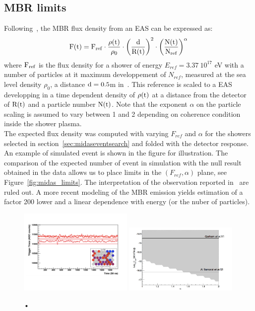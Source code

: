 \documentclass{PoS}
\begin{document}
\subsection{MBR limits}
Following~\cite{gorham}, the MBR flux density from an EAS can be expressed as: 
\begin{equation}
\rm F(t) = F_{ref} \cdot \frac{\rho (t)}{\rho_0}\cdot \left(  \frac{d}{R(t)}\right)^2 \cdot \left( \frac{N(t)}{N_{ref}}\right) ^\alpha
\label{eq:fluxdensity}
\end{equation}
where $\rm F_{ref}$ is the flux density for a shower of energy $E_{ref} = 3.37 \ 10^{17} $ eV with a number of particles at it maximum developpement of $N_{ref}$, measured at the sea level density $\rho_{0}$, a distance $\rm d = 0.5 $m in~\cite{gorham}. This reference is scaled to a EAS developping in a time dependent density of $\rm \rho(t)$ at a distance from the detector of $\rm R(t)$ and a particle number $\rm N(t)$. Note that the exponent $\alpha$ on the particle scaling is assumed to vary between 1 and 2 depending on coherence condition inside the shower plasma. \\The expected flux density was computed with varying $F_{ref}$ and $\alpha$ for the showers selected in section~\ref{sec:midaseventsearch} and folded with the detector response. An example of simulated event is shown in the figure for illustration. The comparison of the expected number of event in simulation with the null result obtained in the data allows us to place limits in the $(F_{ref}, \alpha)$ plane, see Figure~\ref{fig:midas_limits}. The interpretation of the observation reported in~\cite{gorham} are ruled out. A more recent modeling of the MBR emission yields estimation of a factor 200 lower and a linear dependence with energy (or the nuber of particles). 
\begin{figure}[h]
\centering
\includegraphics[width=0.49\textwidth]{midas_candidate_mix.pdf}
\includegraphics[width=0.49\textwidth]{midas_limit.png}
\caption{•}
\label{fig:midas_canditate}
\end{figure}
\end{document}
